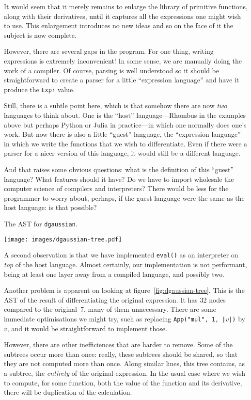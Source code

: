 \documentclass[11pt, a4paper]{article}
\newcommand{\cd}[1]{\texttt{#1}}
\begin{document}
It would seem that it merely remains to enlarge the library of
primitive functions, along with their derivatives, until it captures
all the expressions one might wish to use. This enlargement introduces
no new ideas and so on the face of it the subject is now complete.

However, there are several gaps in the program. For one thing, writing
expressions is extremely inconvenient! In some sense, we are manually
doing the work of a compiler. Of course, parsing is well understood so
it should be straightforward to create a parser for a little
``expression language'' and have it produce the \cd{Expr} value.

Still, there is a subtle point here, which is that somehow there are
now \emph{two} languages to think about. One is the ``host''
language---Rhombus in the examples above but perhaps Python or Julia in
practice---in which one normally does one's work. But now there is also
a little ``guest'' language, the ``expression language'' in which we
write the functions that we wish to differentiate. Even if there were
a parser for a nicer version of this language, it would still be a
different language.

And that raises some obvious questions: what is the definition of this
``guest'' language? What features should it have? Do we have to import
wholesale the computer science of compilers and interpreters?  There
would be less for the programmer to worry about, perhaps, if the guest
language were the same as the host language: is that possible?
\begin{marginfigure}
  \caption{The AST for \cd{dgaussian}.\label{fig:dgaussian-tree}}
  \centering
  \texttt{[image: images/dgaussian-tree.pdf]}
\end{marginfigure}

A second observation is that we have implemented \cd{eval()} as an
interpreter on \emph{top} of the host language. Almost certainly, our
implementation is not performant, being at least one layer away from a
compiled language, and possibly two.

Another problem is apparent on looking at
figure~\ref{fig:dgaussian-tree}. This is the AST of the result of
differentiating the original expression. It has 32 nodes compared to
the original~7, many of them unnecessary. There are some immediate
optimisations we might try, such as replacing \cd{App("mul", 1,
  |$v$|)} by $v$, and it would be straightforward to implement
those.

However, there are other inefficiences that are harder to remove. Some
of the subtrees occur more than once: really, these subtrees should be
shared, so that they are not computed more than once. Along similar
lines, this tree contains, as a subtree, the \emph{entirety} of the
original expression. In the usual case where we wish to compute, for
some function, both the value of the function and its derivative,
there will be duplication of the calculation.
\end{document}
